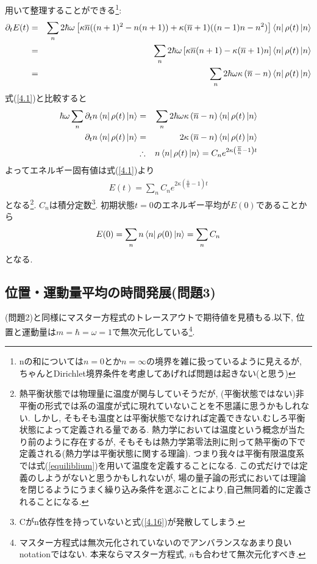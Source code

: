 \documentclass[10.5pt,a4paper]{jreport}
\begin{document}
用いて整理することができる\footnote{nの和については$n=0$とか$n=\infty$の境界を雑に扱っているように見えるが, ちゃんとDirichlet境界条件を考慮してあげれば問題は起きない(と思う)}:
\begin{eqnarray}
  \nonumber \partial_tE(t) &=& \sum_n2\hbar\omega\left[\kappa\overline{n}((n+1)^2-n(n+1)) + \kappa(\overline{n}+1)((n-1)n - n^2)\right]\bra{n}\rho(t)\ket{n}\\
  &=&\sum_n2\hbar\omega\left[\kappa\overline{n}(n+1) - \kappa(\overline{n}+1)n\right]\bra{n}\rho(t)\ket{n}\\
  &=&\sum_n2\hbar\omega\kappa\left(\overline{n} - n\right)\bra{n}\rho(t)\ket{n}
\end{eqnarray}
式(\ref{4.1})と比較すると
\begin{eqnarray}
  \hbar\omega\sum_n\partial_tn\bra{n}\rho(t)\ket{n} &=& \sum_n2\hbar\omega\kappa\left(\overline{n} - n\right)\bra{n}\rho(t)\ket{n}\\
  \partial_tn\bra{n}\rho(t)\ket{n} &=& 2\kappa\left(\overline{n} - n\right) \bra{n}\rho(t)\ket{n}\\
  &\therefore& n\bra{n}\rho(t)\ket{n} = C_ne^{2\kappa\left(\frac{\overline{n}}{n} - 1\right)t}
\end{eqnarray}
よってエネルギー固有値は式(\ref{4.1})より
\begin{eqnarray}
  E(t) = \sum_n C_ne^{2\kappa\left(\frac{\overline{n}}{n} - 1\right)t}
\end{eqnarray}
となる\footnote{熱平衡状態では物理量に温度が関与していそうだが, (平衡状態ではない)非平衡の形式では系の温度が式に現れていないことを不思議に思うかもしれない. しかし, そもそも温度とは平衡状態でなければ定義できない.むしろ平衡状態によって定義される量である. 熱力学においては温度という概念が当たり前のように存在するが, そもそもは熱力学第零法則に則って熱平衡の下で定義される(熱力学は平衡状態に関する理論). つまり我々は平衡有限温度系では式(\ref{equiliblium})を用いて温度を定義することになる. この式だけでは定義のしようがないと思うかもしれないが, 場の量子論の形式においては理論を閉じるようにうまく繰り込み条件を選ぶことにより,自己無同着的に定義されることになる.}.
$C_n$は積分定数\footnote{Cがn依存性を持っていないと式(\ref{4.16})が発散してしまう.}. 初期状態$t = 0$のエネルギー平均が$E(0)$であることから
\begin{eqnarray}
  E(0) = \sum_nn\bra{n}\rho(0)\ket{n} = \sum_nC_n\label{4.16}
\end{eqnarray}
となる. 
\subsection{位置・運動量平均の時間発展(問題3)}
(問題2)と同様にマスター方程式のトレースアウトで期待値を見積もる.以下, 位置と運動量は$m=\hbar=\omega = 1$で無次元化している\footnote{マスター方程式は無次元化されていないのでアンバランスなあまり良いnotationではない. 本来ならマスター方程式, $\overline{n}$も合わせて無次元化すべき.}.
\end{document}
